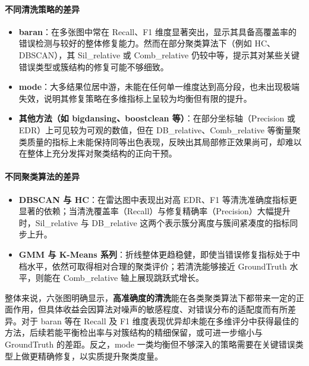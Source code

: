 \documentclass[10pt]{article} %
\numberwithin{equation}{section}
\begin{document}
\begin{enumerate}[label=(\alph*)]
\paragraph{不同清洗策略的差异}  
\begin{itemize}
    \item \textbf{baran}：在多张图中常在 Recall、F1 维度显著突出，显示其具备高覆盖率的错误检测与较好的整体修复能力。然而在部分聚类算法下（例如 HC、DBSCAN），其 Sil\_relative 或 Comb\_relative 仍较中等，提示其对某些关键错误类型或簇结构的修复可能不够细致。  
    \item \textbf{mode}：大多结果位居中游，未能在任何单一维度达到高分段，也未出现极端失效，说明其修复策略在多维指标上呈较为均衡但有限的提升。  
    \item \textbf{其他方法（如 bigdansing、boostclean 等）}：在部分坐标轴（Precision 或 EDR）上可见较为可观的数值，但在 DB\_relative、Comb\_relative 等衡量聚类质量的指标上未能保持同等出色表现，反映出其局部修正效果尚可，却难以在整体上充分发挥对聚类结构的正向干预。
\end{itemize}

\paragraph{不同聚类算法的差异}  
\begin{itemize}
    \item \textbf{DBSCAN 与 HC}：在雷达图中表现出对高 EDR、F1 等清洗准确度指标更显著的依赖；当清洗覆盖率（Recall）与修复精确率（Precision）大幅提升时，Sil\_relative 与 DB\_relative 这两个表示簇分离度与簇间紧凑度的指标同步上升。  
    \item \textbf{GMM 与 K-Means 系列}：折线整体更趋稳健，即使当错误修复指标处于中档水平，依然可取得相对合理的聚类评价；若清洗能够接近 GroundTruth 水平，则能在 Comb\_relative 轴上展现跳跃式增长。
\end{itemize}

\noindent
整体来说，六张图明确显示，\textbf{高准确度的清洗}能在各类聚类算法下都带来一定的正面作用，但具体收益会因算法对噪声的敏感程度、对错误分布的适配度而有所差异。对于 baran 等在 Recall 及 F1 维度表现优异却未能在多维评分中获得最佳的方法，后续若能平衡检出率与对簇结构的精细保留，或可进一步缩小与 GroundTruth 的差距。反之，mode 一类均衡但不够深入的策略需要在关键错误类型上做更精确修复，以实质提升聚类度量。


\end{enumerate}
\end{document}
